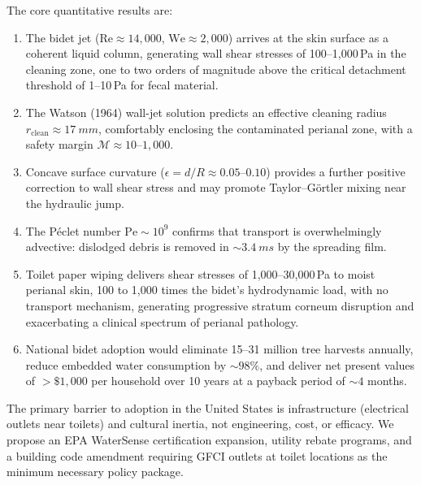 \documentclass[aps,prfluids,reprint,amsmath,amssymb,floatfix]{revtex4-2}
\newcommand{\Rey}{\mathrm{Re}}
\newcommand{\We}{\mathrm{We}}
\newcommand{\Pe}{\mathrm{Pe}}
\begin{document}
The core quantitative results are:

\begin{enumerate}[leftmargin=*]
    \item The bidet jet ($\Rey \approx 14{,}000$, $\We \approx 2{,}000$)
    arrives at the skin surface as a coherent liquid column, generating
    wall shear stresses of 100--1{,}000\,Pa in the cleaning zone, one to
    two orders of magnitude above the critical detachment threshold of
    1--10\,Pa for fecal material.
    \item The Watson (1964) wall-jet solution predicts an effective cleaning
    radius $r_\mathrm{clean} \approx \SI{17}{mm}$, comfortably enclosing the
    contaminated perianal zone, with a safety margin $\mathcal{M} \approx
    10$--$1{,}000$.
    \item Concave surface curvature ($\epsilon = d/R \approx 0.05$--$0.10$)
    provides a further positive correction to wall shear stress and may
    promote Taylor--G\"ortler mixing near the hydraulic jump.
    \item The P\'{e}clet number $\Pe \sim 10^9$ confirms that transport is
    overwhelmingly advective: dislodged debris is removed in
    $\sim\!\SI{3.4}{ms}$ by the spreading film.
    \item Toilet paper wiping delivers shear stresses of 1{,}000--30{,}000\,Pa
    to moist perianal skin, 100 to 1{,}000 times the bidet's hydrodynamic
    load, with no transport mechanism, generating progressive stratum corneum
    disruption and exacerbating a clinical spectrum of perianal pathology.
    \item National bidet adoption would eliminate 15--31 million tree harvests
    annually, reduce embedded water consumption by $\sim\!98\%$, and deliver
    net present values of $>\$1{,}000$ per household over 10 years at a
    payback period of $\sim\!4$ months.
\end{enumerate}

The primary barrier to adoption in the United States is infrastructure
(electrical outlets near toilets) and cultural inertia, not engineering,
cost, or efficacy. We propose an EPA WaterSense certification expansion,
utility rebate programs, and a building code amendment requiring GFCI outlets
at toilet locations as the minimum necessary policy package.
\end{document}
